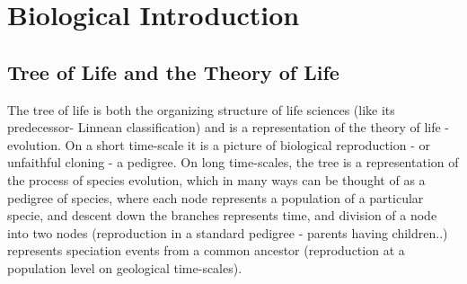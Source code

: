 \section{Biological Introduction}

\subsection{Tree of Life and the Theory of Life}
The tree of life is both the organizing structure of life sciences (like its predecessor- Linnean classification) and is a representation of the theory of life - evolution.  On a short time-scale it is a picture of biological reproduction - or unfaithful cloning - a pedigree.  On long time-scales, the tree is a representation of the process of species evolution, which in many ways can be thought of as a pedigree of species, where each node represents a population of a particular specie, and descent down the branches represents time, and division of a node into two nodes (reproduction in a standard pedigree - parents having children..) represents speciation events from a common ancestor (reproduction at a population level on geological time-scales).
